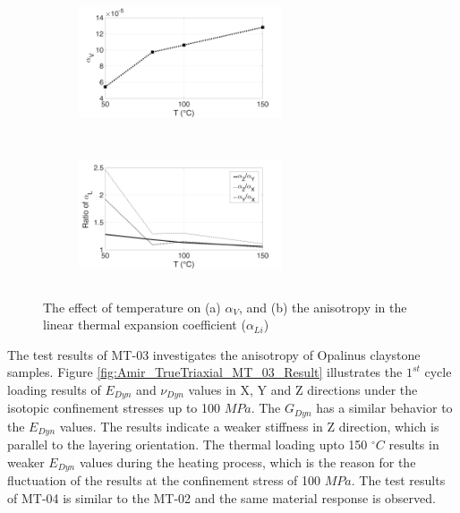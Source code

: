 \begin{figure}[!ht]
\centering
\begin{subfigure}[c]{0.48\textwidth}
\centering
\includegraphics[width=6cm,height=4cm]{figures/Amir_TrueTriaxial_MT_02_Result_1a.png}
\subcaption{}
\label{fig:Amir_TrueTriaxial_MT_02_Result_1a}
\end{subfigure}
\hfill
\begin{subfigure}[c]{0.48\textwidth}
\centering
\includegraphics[width=6cm,height=4cm]{figures/Amir_TrueTriaxial_MT_02_Result_1b.png}
\subcaption{}
\label{fig:Amir_TrueTriaxial_MT_02_Result_1b}
\end{subfigure}
\caption{The effect of temperature on (a) $\alpha_V$, and (b) the anisotropy in the linear thermal expansion coefficient ($\alpha_{Li}$)}
\end{figure}

The test results of MT-03 investigates the anisotropy of Opalinus claystone samples. Figure \ref{fig:Amir_TrueTriaxial_MT_03_Result} illustrates the $1^{st}$ cycle loading results of $E_{Dyn}$ and $\nu_{Dyn}$ values in X, Y and Z directions under the isotopic confinement stresses up to 100 $MPa$. The $G_{Dyn}$ has a similar behavior to the $E_{Dyn}$ values. The results indicate a weaker stiffness in Z direction, which is parallel to the layering orientation. The thermal loading upto 150 $^{\circ}C$ results in weaker $E_{Dyn}$ values during the heating process, which is the reason for the fluctuation of the results at the confinement stress of 100 $MPa$. The test results of MT-04 is similar to the MT-02 and the same material response is observed. 

